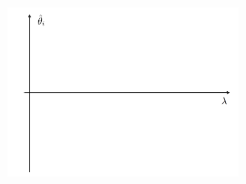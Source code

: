 \documentclass[a4paper,11pt,oneside]{book}
\begin{document}
\begin{enumerate}
        \begin{figure}[H]
            \centering
            \includegraphics[width=0.6\textwidth,height=0.4\textheight,keepaspectratio]{images/2_26_Jun_2018.png}
        \end{figure}
    \end{enumerate}

\clearpage
\end{document}
